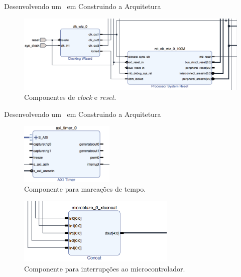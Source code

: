 \begin{frame}{Desenvolvendo um \Wearable\ em \Software }{Construindo a Arquitetura}
\vspace{-0.8em}
\begin{figure}[h] \centering
\includegraphics[width=1\textwidth]{img/vivado_software/2-clock.png}
\caption{Componentes de \textit{clock} e \textit{reset}.}
\end{figure}
\end{frame}

\begin{frame}{Desenvolvendo um \Wearable\ em \Software }{Construindo a Arquitetura}
\vspace{-1.6em}
\begin{figure}[h] \centering
\includegraphics[width=0.4\textwidth]{img/vivado_software/3a-timer.png}
\vspace{-1em}
\caption{Componente para marcações de tempo.}
\end{figure}
\begin{figure}[h] \centering
\includegraphics[width=0.67\textwidth]{img/vivado_software/3b-interruptions.png}
\vspace{-1em}
\caption{Componente para interrupções ao microcontrolador.}
\end{figure}
\end{frame}

